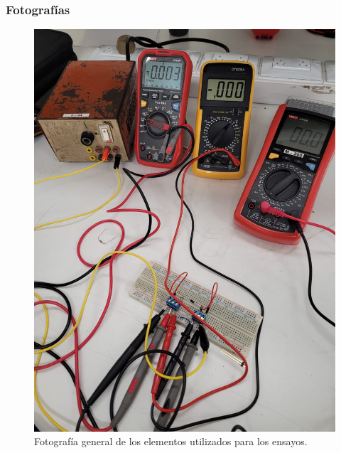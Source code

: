 \documentclass[chaptersright]{informeutn}
\begin{document}
    \subsubsection{Fotografías}
      \begin{figure}[H]
        \centering
        \includegraphics[width=.35\textwidth]{pictures/disposicion-elementos.jpeg}
        \caption{Fotografía general de los elementos utilizados para los ensayos.}
      \end{figure}
\end{document}
